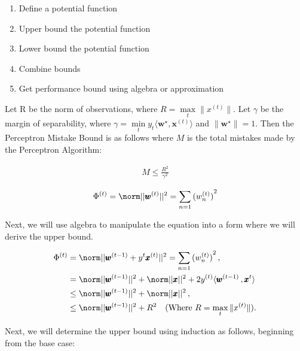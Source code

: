 \documentclass[11pt]{article}
\begin{document}
\begin{enumerate}
    \item Define a potential function
    \item Upper bound the potential function
    \item Lower bound the potential function
    \item Combine bounds
    \item Get performance bound using algebra or approximation
\end{enumerate}

 Let R be the norm of observations, where $R=\max\limits_t \|x^{(t)}\|$. Let $\gamma$ be the margin of separability, where $\gamma=\min\limits_t y_t \langle \textbf{w}^\star, \textbf{x}^{(t)} \rangle $ and $\|\textbf{w}^\star\|=1$. Then the Perceptron Mistake Bound is as follows where $M$ is the total mistakes made by the Perceptron Algorithm:

\begin{align}
    M \leq \frac{R^{2}}{\gamma^{2}}
\end{align}


\begin{align}
    \Phi^{(t)} = \norm ||{\pmb{w} ^ {(t)}}||^{2} = \sum_{n=1} {(w_n^{(t)})}^{2}\label{eq:perceptron_potential}
\end{align}

Next, we will use algebra to manipulate the equation into a form where we will derive the upper bound.

\begin{align}
    \Phi^{(t)} &= \norm ||{ \pmb{w} ^ {(t-1)} + y^{t}\pmb{x}^{(t)}}||^{2} = \sum_{n=1} {(w_n^{(t)})}^{2}\, , \\
             &= \norm ||{ \pmb{w} ^ {(t-1)} }||^{2} + \norm ||{ \pmb{x} }||^{2} + 2 y^{(t)} \langle \pmb{w}^{(t-1)} \, , \pmb{x} ^{t} \rangle\, \\
             &\le \norm ||{ \pmb{w} ^ {(t-1)} } ||^{2} + \norm ||{ \pmb{x} } ||^{2} \,, \\
             &\le  \norm ||{ \pmb{w} ^ {(t-1)} }||^{2} + R^2 \, \;\;\; \text{(Where } R=\max\limits_t \|x^{(t)}\| ). \label{eq:potential_upper1}
\end{align}

Next, we will determine the upper bound using induction as follows, beginning from the base case:
\end{document}
